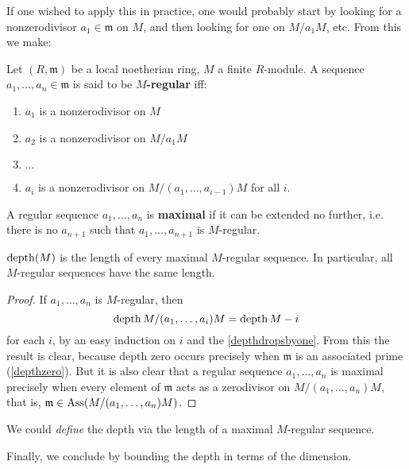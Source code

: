 If one wished to apply this in practice, one would probably start by
looking for a
nonzerodivisor $a_1 \in \mathfrak{m}$ on $M$, and then looking for
one on $M/a_1
M$, etc.
From this we make:

\begin{definition}
Let $(R, \mathfrak{m})$ be a local noetherian ring, $M$ a finite
$R$-module. A
sequence $a_1, \dots, a_n \in \mathfrak{m}$ is said to be
\textbf{$M$-regular} iff:
\begin{enumerate}
\item $a_1$ is a nonzerodivisor on $M$
\item $a_2$ is a nonzerodivisor on $M/a_1 M$
\item  $\dots$
\item $a_i$ is a nonzerodivisor on $M/(a_1, \dots, a_{i-1})M$
for all $i$.
\end{enumerate}
A regular sequence $a_1, \dots, a_n$ is \textbf{maximal } if it
can be extended
no further, i.e. there is no $a_{n+1}$ such that $a_1, \dots,
a_{n+1}$ is
$M$-regular.
\end{definition}

\begin{corollary} \label{depthregular}
$\operatorname{depth}(M)$ is the length of every maximal $M$-regular
sequence. In particular,
all $M$-regular sequences have the same length.
\end{corollary}

\begin{proof}
If $a_1, \dots, a_n$ is $M$-regular, then
\[ \operatorname{depth} M/(a_1, \dots, a_i)M = \operatorname{depth} M -i  \]
for each $i$, by an easy induction on $i$ and the \cref{depthdropsbyone}.
From this the result is clear, because depth zero occurs precisely when
$\mathfrak{m}$ is an associated prime (\cref{depthzero}). But it is also clear 
that a regular sequence $a_1, \dots, a_n$ is maximal precisely when every
element of $\mathfrak{m}$ acts as a zerodivisor on $M/(a_1, \dots, a_n) M$,
that is, $\mathfrak{m} \in \operatorname{Ass}(M/(a_1, \dots, a_n)M)$.
\end{proof}

\begin{remark}
We could \emph{define} the depth via the length of a maximal
$M$-regular sequence.
\end{remark}

Finally, we conclude by bounding the depth in terms of the dimension. 

